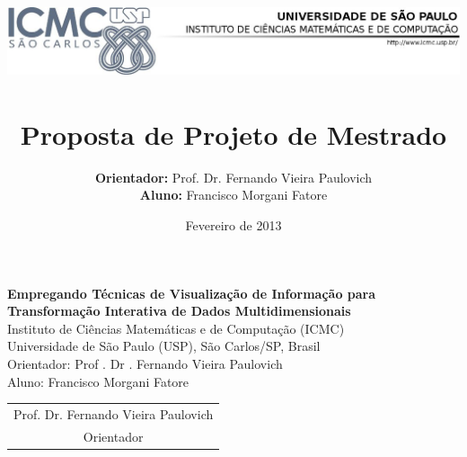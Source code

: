 \documentclass[brazil, a4paper, 12pt, titlepage]{article}
\title{
  \vspace{-4.5cm}
  \includegraphics[width=15cm]{images/logo.png}\\
  \vspace{6cm}
  \renewcommand{\baselinestretch}{1.75}{%
    \huge \doctitle}
  \vspace{2cm}
  \Large \\
  Proposta de Projeto de Mestrado \\
}
\author{
  \textbf{Orientador:} Prof. Dr. Fernando Vieira Paulovich\\
  \textbf{Aluno:} Francisco Morgani Fatore\\
}
\date{Fevereiro de 2013}
\newcommand{\doctitle}{Empregando Técnicas de Visualização
de Informação para Transformação Interativa de Dados
Multidimensionais}
\renewcommand{\baselinestretch}{1.75}{%
    \huge \doctitle}
\renewcommand{\baselinestretch}{1.5} %
\begin{document}
\maketitle

\clearpage
\thispagestyle{empty}

\begin{center}
  \renewcommand{\baselinestretch}{1.0}{
    \large{\textbf{\doctitle}\\
    \huge }
    \vspace{1.5cm}
    \normalsize{Instituto de Ciências Matemáticas e de Computação (ICMC)\\
    Universidade de São Paulo (USP), São Carlos/SP, Brasil}\\
    \vspace{1cm}
    \normalsize{Orientador: Prof . Dr . Fernando Vieira Paulovich\\
    Aluno: Francisco Morgani Fatore}
  }
  \vspace{1cm}
\end{center}



\clearpage

\thispagestyle{empty}
\tableofcontents  
\clearpage

\setcounter{page}{1}

%
%

%


\clearpage
\printbibliography

\vspace{1.5cm}
\begin{table}[htb]
  \centering
  \begin{tabular}{c}
    \hline
    Prof. Dr. Fernando Vieira Paulovich\\
    Orientador
  \end{tabular} 
\end{table}
\end{document}
